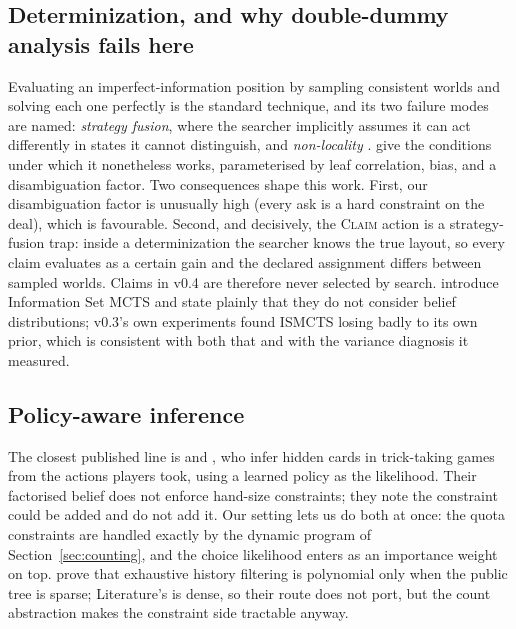 \documentclass[11pt,letterpaper]{article}
\begin{document}
\subsection{Determinization, and why double-dummy analysis fails here}
 Evaluating an
imperfect-information position by sampling consistent worlds and solving each
one perfectly is the standard technique, and its two failure modes are named:
\emph{strategy fusion}, where the searcher implicitly assumes it can act
differently in states it cannot distinguish, and \emph{non-locality}
\citep{frank1998search}. \citet{long2010understanding} give the conditions under
which it nonetheless works, parameterised by leaf correlation, bias, and a
disambiguation factor. Two consequences shape this work. First, our
disambiguation factor is unusually high (every ask is a hard constraint on the
deal), which is favourable. Second, and decisively, the \textsc{Claim} action
is a strategy-fusion trap: inside a determinization the searcher knows the true
layout, so every claim evaluates as a certain gain and the declared assignment
differs between sampled worlds. Claims in v0.4 are therefore never selected by
search. \citet{cowling2012ismcts} introduce Information Set MCTS and state
plainly that they do not consider belief distributions; v0.3's own experiments
found ISMCTS losing badly to its own prior, which is consistent with both that
and with the variance diagnosis it measured.

\subsection{Policy-aware inference}
 The closest published line is
\citet{solinas2019improving} and \citet{rebstock2019policy}, who infer hidden
cards in trick-taking games from the actions players took, using a learned
policy as the likelihood. Their factorised belief does not enforce hand-size
constraints; they note the constraint could be added and do not add it. Our
setting lets us do both at once: the quota constraints are handled exactly by
the dynamic program of Section~\ref{sec:counting}, and the choice likelihood
enters as an importance weight on top. \citet{solinas2023history} prove that
exhaustive history filtering is polynomial only when the public tree is sparse;
Literature's is dense, so their route does not port, but the count abstraction
makes the constraint side tractable anyway.
\end{document}
